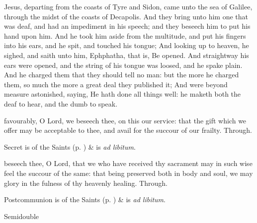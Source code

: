  Jesus, departing from the coasts of Tyre and Sidon, came unto the sea of Galilee, through the midst of the coasts of Decapolis. And they bring unto him one that was deaf, and had an impediment in his speech; and they beseech him to put his hand upon him. And he took him aside from the multitude, and put his fingers into his ears, and he spit, and touched his tongue; And looking up to heaven, he sighed, and saith unto him, Ephphatha, that is, Be opened. And straightway his ears were opened, and the string of his tongue was loosed, and he spake plain. And he charged them that they should tell no man: but the more he charged them, so much the more a great deal they published it; And were beyond measure astonished, saying, He hath done all things well: he maketh both the deaf to hear, and the dumb to speak.


\secret
{} favourably, O Lord, we beseech thee, on this our service: that the gift which we offer may be acceptable to thee, and avail for the succour of our frailty. Through.
\begin{rubric}
     Secret is of the Saints (p. \pageref{SPSaints}) \&  is \emph{ad libitum}.
\end{rubric}


\postcommunion
{} beseech thee, O Lord, that we who have received thy sacrament may in such wise feel the succour of the same: that being preserved both in body and soul, we may glory in the fulness of thy heavenly healing. Through.
\begin{rubric}
     Postcommunion is of the Saints (p. \pageref{SPSaints}) \&  is \emph{ad libitum}.
\end{rubric}

\begin{inhead}
{Semidouble}
\end{inhead}
\par\noindent
{}

